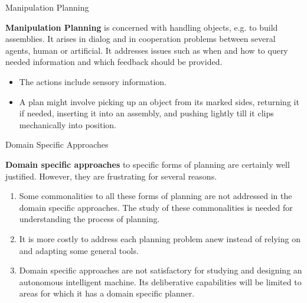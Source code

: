 \documentclass[9pt]{beamer}
\begin{document}
\begin{frame}{Manipulation Planning}
\begin{small}
\textcolor{CS-1light}{\textbf{Manipulation Planning}} is concerned with handling objects, e.g. to build assemblies. It arises in dialog and in cooperation problems between several agents, human or artificial. It addresses issues such as when and how to query needed information and which feedback should be provided.

\begin{itemize}
\item The actions include sensory information.
\item A plan might involve picking up an object from its marked sides, returning it if needed, inserting it into an assembly, and pushing lightly till it clips mechanically into position.
\end{itemize}
\end{small}
\end{frame}

\begin{frame}{Domain Specific Approaches}
\begin{small}
\textbf{Domain specific approaches} to specific forms of planning are certainly well justified. However, they are frustrating for several reasons.

\begin{enumerate}
\item Some commonalities to all these forms of planning are not addressed in the domain specific approaches. The study of these commonalities is needed for understanding the process of planning.
\item It is more costly to address each planning problem anew instead of relying on and adapting some general tools.
\item Domain specific approaches are not satisfactory for studying and designing an autonomous intelligent machine. Its deliberative capabilities will be limited to areas for which it has a domain specific planner.
\end{enumerate}
\end{small}
\end{frame}
\end{document}
